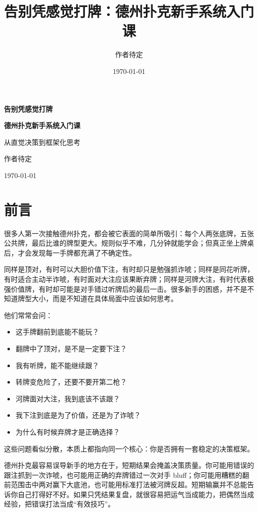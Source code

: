\documentclass[UTF8,openany,zihao=-4]{ctexbook}
\title{告别凭感觉打牌：德州扑克新手系统入门课}
\author{作者待定}
\date{\today}
\begin{document}
\frontmatter

\begin{titlepage}
  \centering
  \vspace*{3cm}
  {\bfseries 告别凭感觉打牌\par}
  \vspace{0.8cm}
  {\bfseries 德州扑克新手系统入门课\par}
  \vspace{1.5cm}
  { 从直觉决策到框架化思考\par}
  \vfill
  { 作者待定\par}
  \vspace{0.5cm}
  {\today\par}
\end{titlepage}

\chapter*{前言}

很多人第一次接触德州扑克，都会被它表面的简单所吸引：每个人两张底牌，五张公共牌，最后比谁的牌型更大。规则似乎不难，几分钟就能学会；但真正坐上牌桌后，才会发现每一手牌都充满了不确定性。

同样是顶对，有时可以大胆价值下注，有时却只是勉强抓诈唬；同样是同花听牌，有时适合主动半诈唬，有时面对大注应该果断弃牌；同样是河牌大注，有时代表极强价值牌，有时却可能是对手错过听牌后的最后一击。很多新手的困惑，并不是不知道牌型大小，而是不知道在具体局面中应该如何思考。

他们常常会问：

\begin{itemize}
\item 这手牌翻前到底能不能玩？
\item 翻牌中了顶对，是不是一定要下注？
\item 我有听牌，能不能继续跟？
\item 转牌变危险了，还要不要开第二枪？
\item 河牌面对大注，我到底该不该跟？
\item 我下注到底是为了价值，还是为了诈唬？
\item 为什么有时候弃牌才是正确选择？
\end{itemize}

这些问题看似分散，本质上都指向同一个核心：你是否拥有一套稳定的决策框架。

德州扑克最容易误导新手的地方在于，短期结果会掩盖决策质量。你可能用错误的跟注抓到一次诈唬，也可能用正确的弃牌错过一次对手 bluff；你可能用糟糕的翻前范围击中两对赢下大底池，也可能用标准打法被河牌反超。短期输赢并不总能告诉你自己打得好不好。如果只凭结果复盘，就很容易把运气当成能力，把偶然当成经验，把错误打法当成“有效技巧”。
\end{document}
